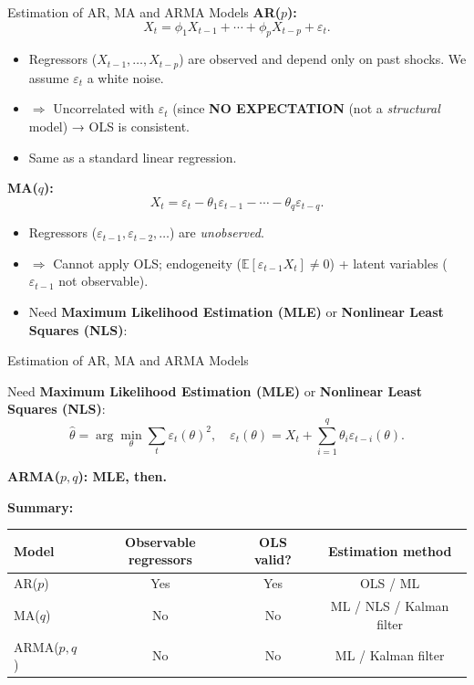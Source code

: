 \documentclass{beamer}
\begin{document}
\begin{frame}{Estimation of AR, MA and ARMA Models}
\small
\textbf{AR($p$):}
\[
X_t = \phi_1 X_{t-1} + \cdots + \phi_p X_{t-p} + \varepsilon_t.
\]
\begin{itemize}
  \item Regressors ($X_{t-1},\dots,X_{t-p}$) are observed and depend only on past shocks. We assume $\varepsilon_t$ a white noise.
  \item $\Rightarrow$ Uncorrelated with $\varepsilon_t$ (since \textbf{NO EXPECTATION} (not a \textit{structural} model) → OLS is consistent.
  \item Same as a standard linear regression.
\end{itemize}

\pause
\textbf{MA($q$):}
\[
X_t = \varepsilon_t - \theta_1 \varepsilon_{t-1} - \cdots - \theta_q \varepsilon_{t-q}.
\]
\begin{itemize}
  \item Regressors ($\varepsilon_{t-1},\varepsilon_{t-2},\dots$) are \emph{unobserved}.
  \item $\Rightarrow$ Cannot apply OLS; endogeneity ($\mathbb{E}[\varepsilon_{t-1} X_t] \neq 0$)
 + latent variables ($\varepsilon_{t-1}$ not observable). 
  \item Need \textbf{Maximum Likelihood Estimation (MLE)} or \textbf{Nonlinear Least Squares (NLS)}:

\end{itemize}
\end{frame}


\begin{frame}{Estimation of AR, MA and ARMA Models}
\small

Need \textbf{Maximum Likelihood Estimation (MLE)} or \textbf{Nonlinear Least Squares (NLS)}:
  \[
  \hat{\theta} = \arg\min_\theta \sum_t \varepsilon_t(\theta)^2,
  \quad \varepsilon_t(\theta) = X_t + \sum_{i=1}^q \theta_i \varepsilon_{t-i}(\theta).
  \]
  
\textbf{ ARMA($p,q$): MLE, then.}
 
\textbf{Summary:}
\begin{center}
\begin{tabular}{lccc}
\toprule
Model & Observable regressors & OLS valid? & Estimation method \\
\midrule
AR($p$) & Yes & Yes& OLS / ML\\
MA($q$) & No & No& ML / NLS / Kalman filter \\
ARMA($p,q$) & No& No& ML / Kalman filter \\
\bottomrule
\end{tabular}
\end{center}
\end{frame}
\end{document}
